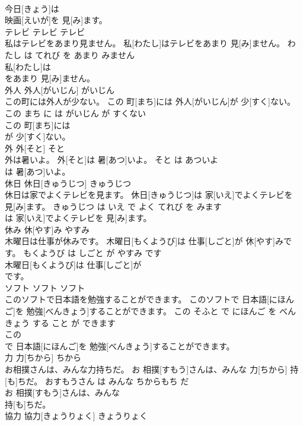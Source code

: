 \documentclass[8pt]{extreport}
\begin{document}
\begin{CJK}{UTF8}{min}
\\	今日[きょう]は
\\	映画[えいが]を 見[み]ます。		
\\	テレビ	テレビ	テレビ	
\\	私はテレビをあまり見ません。	私[わたし]はテレビをあまり 見[み]ません。	わたし は てれび を あまり みません	
\\	私[わたし]は
\\	をあまり 見[み]ません。		
\\	外人	外人[がいじん]	がいじん	
\\	この町には外人が少ない。	この 町[まち]には 外人[がいじん]が 少[すく]ない。	この まち に は がいじん が すくない	
\\	この 町[まち]には
\\	が 少[すく]ない。		
\\	外	外[そと]	そと	
\\	外は暑いよ。	外[そと]は 暑[あつ]いよ。	そと は あついよ	
\\	は 暑[あつ]いよ。		
\\	休日	休日[きゅうじつ]	きゅうじつ	
\\	休日は家でよくテレビを見ます。	休日[きゅうじつ]は 家[いえ]でよくテレビを 見[み]ます。	きゅうじつ は いえ で よく てれび を みます	
\\	は 家[いえ]でよくテレビを 見[み]ます。		
\\	休み	休[やす]み	やすみ	
\\	木曜日は仕事が休みです。	木曜日[もくようび]は 仕事[しごと]が 休[やす]みです。	もくようび は しごと が やすみ です	
\\	木曜日[もくようび]は 仕事[しごと]が
\\	です。		
\\	ソフト	ソフト	ソフト	
\\	このソフトで日本語を勉強することができます。	このソフトで 日本語[にほんご]を 勉強[べんきょう]することができます。	この そふと で にほんご を べんきょう する こと が できます	
\\	この
\\	で 日本語[にほんご]を 勉強[べんきょう]することができます。		
\\	力	力[ちから]	ちから	
\\	お相撲さんは、みんな力持ちだ。	お 相撲[すもう]さんは、みんな 力[ちから] 持[も]ちだ。	おすもうさん は みんな ちからもち だ	
\\	お 相撲[すもう]さんは、みんな
\\	持[も]ちだ。		
\\	協力	協力[きょうりょく]	きょうりょく	

\end{CJK}
\end{document}
